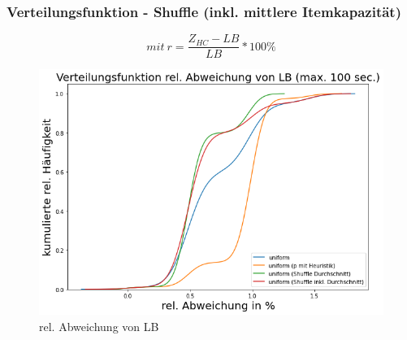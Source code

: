 \documentclass{beamer}
\begin{document}
\begin{frame}

\frametitle{Verteilungsfunktion - Shuffle (inkl. mittlere Itemkapazität)}

\begin{footnotesize}
\begin{equation}
mit \ r = \frac{Z_{HC}-LB}{LB} * 100\%
\end{equation}
\end{footnotesize}

\begin{figure}[!htbp]
\begin{center}
\includegraphics[scale=0.3]{img/dist6.png}
\end{center}
\caption{rel. Abweichung von LB}
\label{fig:architecture}
\end{figure}



\end{frame}

\end{document}
